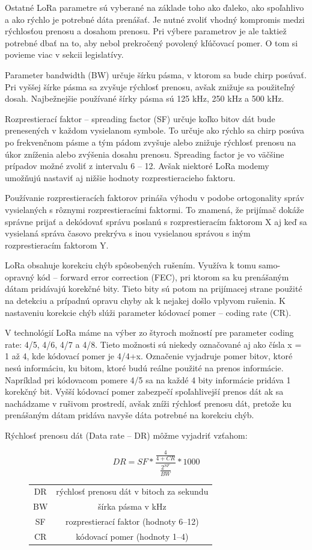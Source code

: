 \documentclass[slovak,master]{diploma}
\begin{document}
Ostatné LoRa parametre sú vyberané na základe toho ako ďaleko, ako spoľahlivo a ako rýchlo je potrebné dáta prenášať. Je nutné zvoliť vhodný kompromis medzi rýchlosťou prenosu 
a dosahom prenosu. Pri výbere parametrov je ale taktiež potrebné dbať na to, aby nebol prekročený povolený kľúčovací pomer. O tom si povieme viac v sekcii legislatívy.

Parameter bandwidth (BW) určuje šírku pásma, v ktorom sa bude chirp posúvať. Pri vyššej šírke pásma sa zvyšuje rýchlosť prenosu, avšak znižuje sa použiteľný dosah.
Najbežnejšie používané šírky pásma sú 125 kHz, 250 kHz a 500 kHz.

Rozprestierací faktor -- spreading factor (SF) určuje koľko bitov dát bude prenesených v každom vysielanom symbole. To určuje ako rýchlo sa chirp posúva po frekvenčnom pásme a tým pádom 
zvyšuje alebo znižuje rýchlosť prenosu na úkor zníženia alebo zvýšenia dosahu prenosu. Spreading factor je vo väčšine prípadov možné zvoliť z intervalu 6 -- 12. 
Avšak niektoré LoRa modemy umožňujú nastaviť aj nižšie hodnoty rozprestieracieho faktoru. 

Používanie rozprestieracích faktorov prináša výhodu v podobe ortogonality správ vysielaných s rôznymi rozprestieracími faktormi. 
To znamená, že prijímač dokáže správne prijať a dekódovať správu poslanú s rozprestieracím faktorom X aj 
keď sa vysielaná správa časovo prekrýva s inou vysielanou správou s iným rozprestieracím faktorom Y.

LoRa obsahuje korekciu chýb spôsobených rušením. Využíva k tomu samo-opravný kód -- forward error correction (FEC), pri ktorom 
sa ku prenášaným dátam pridávajú korekčné bity. Tieto bity sú potom na prijímacej strane použité na detekciu a prípadnú opravu chyby ak k nejakej došlo vplyvom rušenia.
K nastaveniu korekcie chýb slúži parameter kódovací pomer -- coding rate (CR).

V technológií LoRa máme na výber zo štyroch možností pre parameter coding rate: 4/5, 4/6, 4/7 a 4/8. 
Tieto možnosti sú niekedy označované aj ako čísla x = 1 až 4, kde kódovací pomer je 4/4+x.
Označenie vyjadruje pomer bitov, ktoré nesú informáciu, ku bitom, ktoré budú reálne použité na prenos informácie. 
Napríklad pri kódovacom pomere 4/5 sa na každé 4 bity informácie pridáva 1 korekčný bit.
Vyšší kódovací pomer zabezpečí spoľahlivejší prenos dát ak sa nachádzame v rušivom prostredí, avšak zníži rýchlosť prenosu dát, 
pretože ku prenášaným dátam pridáva navyše dáta potrebné na korekciu chýb.

Rýchlosť prenosu dát (Data rate -- DR) môžme vyjadriť vzťahom:
\begin{figure}[h!]
  \centering
  \[DR = SF * \frac{\frac{4}{4+CR}}{\frac{2^{SF}}{BW}} *1000 \]
  \begin{tabular}{c c}
    DR & rýchlosť prenosu dát v bitoch za sekundu\\
    BW & šírka pásma v kHz \\
    SF & rozprestierací faktor (hodnoty 6--12) \\
    CR & kódovací pomer (hodnoty 1--4) \\
  \end{tabular}
\end{figure}
\end{document}
